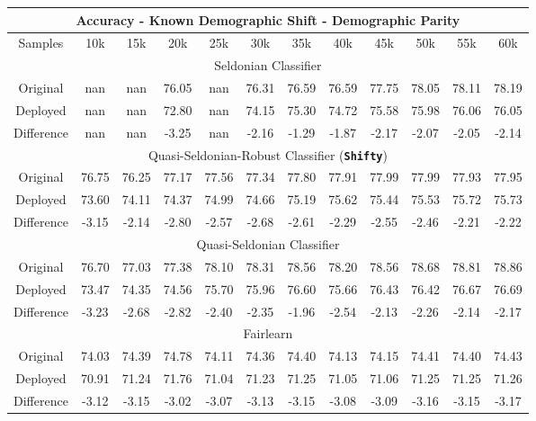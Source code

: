 \begin{table}[ht] 
\footnotesize 
\begin{tabular}{|c|ccccccccccc|} \hline \multicolumn{12}{|c|}{Accuracy - Known Demographic Shift - Demographic Parity} \\ \hline \hline

Samples & 10k & 15k & 20k & 25k & 30k & 35k & 40k & 45k & 50k & 55k & 60k \\ \hline

\multicolumn{12}{|c|}{Seldonian Classifier} \\ \hline
Original & nan & nan & 76.05 & nan & 76.31 & 76.59 & 76.59 & 77.75 & 78.05 & 78.11 & 78.19 \\ \hline
Deployed & nan & nan & 72.80 & nan & 74.15 & 75.30 & 74.72 & 75.58 & 75.98 & 76.06 & 76.05 \\ \hline 
Difference & nan & nan & -3.25 & nan & -2.16 & -1.29 & -1.87 & -2.17 & -2.07 & -2.05 & -2.14 \\ \hline

\multicolumn{12}{|c|}{Quasi-Seldonian-Robust Classifier (\textbf{\texttt{Shifty}})} \\ \hline
Original & 76.75 & 76.25 & 77.17 & 77.56 & 77.34 & 77.80 & 77.91 & 77.99 & 77.99 & 77.93 & 77.95 \\ \hline
Deployed & 73.60 & 74.11 & 74.37 & 74.99 & 74.66 & 75.19 & 75.62 & 75.44 & 75.53 & 75.72 & 75.73 \\ \hline
Difference & -3.15 & -2.14 & -2.80 & -2.57 & -2.68 & -2.61 & -2.29 & -2.55 & -2.46 & -2.21 & -2.22 \\ \hline

\multicolumn{12}{|c|}{Quasi-Seldonian Classifier} \\ \hline
Original & 76.70 & 77.03 & 77.38 & 78.10 & 78.31 & 78.56 & 78.20 & 78.56 & 78.68 & 78.81 & 78.86 \\ \hline
Deployed & 73.47 & 74.35 & 74.56 & 75.70 & 75.96 & 76.60 & 75.66 & 76.43 & 76.42 & 76.67 & 76.69 \\ \hline
Difference & -3.23 & -2.68 & -2.82 & -2.40 & -2.35 & -1.96 & -2.54 & -2.13 & -2.26 & -2.14 & -2.17 \\ \hline

\multicolumn{12}{|c|}{Fairlearn} \\ \hline
Original & 74.03 & 74.39 & 74.78 & 74.11 & 74.36 & 74.40 & 74.13 & 74.15 & 74.41 & 74.40 & 74.43 \\ \hline
Deployed & 70.91 & 71.24 & 71.76 & 71.04 & 71.23 & 71.25 & 71.05 & 71.06 & 71.25 & 71.25 & 71.26 \\ \hline
Difference & -3.12 & -3.15 & -3.02 & -3.07 & -3.13 & -3.15 & -3.08 & -3.09 & -3.16 & -3.15 & -3.17 \\ \hline 


\end{tabular}
\end{table}
